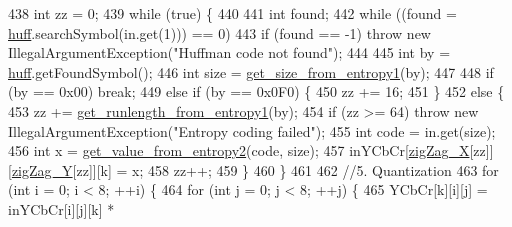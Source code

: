 \begin{DoxyCode}
438                     \textcolor{keywordtype}{int} zz = 0;
439                     \textcolor{keywordflow}{while} (\textcolor{keyword}{true}) \{
440 
441                         \textcolor{keywordtype}{int} found;
442                         \textcolor{keywordflow}{while} ((found = \hyperlink{classdomini_1_1algorithm_1_1JPEG_aacc6445baa7819e3f9139ffb78e0b8f4}{huff}.searchSymbol(in.get(1))) == 0)
443                         \textcolor{keywordflow}{if} (found == -1) \textcolor{keywordflow}{throw} \textcolor{keyword}{new} IllegalArgumentException(\textcolor{stringliteral}{"Huffman code not found"});
444                         
445                         \textcolor{keywordtype}{int} by = \hyperlink{classdomini_1_1algorithm_1_1JPEG_aacc6445baa7819e3f9139ffb78e0b8f4}{huff}.getFoundSymbol();
446                         \textcolor{keywordtype}{int} size = \hyperlink{classdomini_1_1algorithm_1_1JPEG_a8d1005fb7833d36a064afb1c5e15bbd3}{get\_size\_from\_entropy1}(by);
447 
448                         \textcolor{keywordflow}{if} (by == 0x00) \textcolor{keywordflow}{break};
449                         \textcolor{keywordflow}{else} \textcolor{keywordflow}{if} (by == 0x0F0) \{
450                             zz += 16;
451                         \}
452                         \textcolor{keywordflow}{else} \{
453                             zz += \hyperlink{classdomini_1_1algorithm_1_1JPEG_ac58cb434a7acfd90fc8e548fd7c00ae2}{get\_runlength\_from\_entropy1}(by);
454                             \textcolor{keywordflow}{if} (zz >= 64) \textcolor{keywordflow}{throw} \textcolor{keyword}{new} IllegalArgumentException(\textcolor{stringliteral}{"Entropy coding failed"});
455                             \textcolor{keywordtype}{int} code = in.get(size);
456                             \textcolor{keywordtype}{int} x = \hyperlink{classdomini_1_1algorithm_1_1JPEG_a41c69fe2e29999dd17a555859df22530}{get\_value\_from\_entropy2}(code, size);
457                             inYCbCr[\hyperlink{classdomini_1_1algorithm_1_1JPEG_a7d3829cbffd758c087341a8da13dd2ca}{zigZag\_X}[zz]][\hyperlink{classdomini_1_1algorithm_1_1JPEG_ad886d8aa00a40cb151b446534f0d1bcc}{zigZag\_Y}[zz]][k] = x;
458                             zz++;
459                         \}
460                     \}
461 
462                     \textcolor{comment}{//5. Quantization}
463                     \textcolor{keywordflow}{for} (\textcolor{keywordtype}{int} i = 0; i < 8; ++i) \{
464                         \textcolor{keywordflow}{for} (\textcolor{keywordtype}{int} j = 0; j < 8; ++j) \{
465                             YCbCr[k][i][j] = inYCbCr[i][j][k] * 

\end{DoxyCode}
